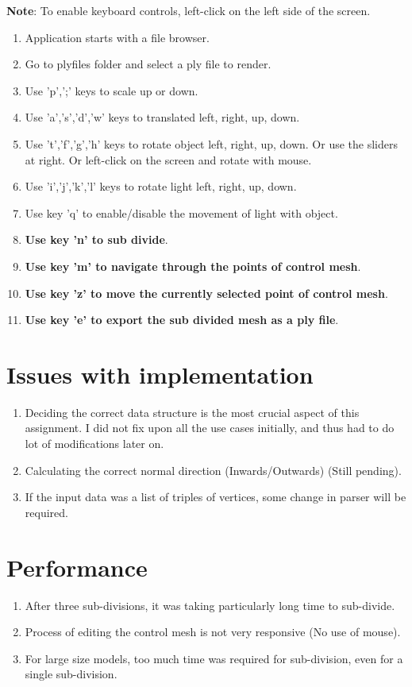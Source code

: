 \documentclass[11pt]{article}
\begin{document}
\textbf{Note}: To enable keyboard controls, left-click on the left side of the screen.

\begin {enumerate}
\item Application starts with a file browser.
\item Go to plyfiles folder and select a ply file to render.
\item Use 'p',';' keys to scale up or down.
\item Use 'a','s','d','w' keys to translated left, right, up, down.
\item Use 't','f','g','h' keys to rotate object left, right, up, down. Or use the sliders at right. Or left-click on the screen and rotate with mouse.
\item Use 'i','j','k','l' keys to rotate light left, right, up, down.
\item Use key 'q' to enable/disable the movement of light with object.
\item \textbf{Use key 'n' to sub divide}.
\item \textbf{Use key 'm' to navigate through the points of control mesh}.
\item \textbf{Use key 'z' to move the currently selected point of control mesh}.
\item \textbf{Use key 'e' to export the sub divided mesh as a ply file}.


\end {enumerate}

\section{ Issues with implementation}

\begin {enumerate}
\item Deciding the correct data structure is the most crucial aspect of this assignment. I did not fix upon all the use cases initially, and thus had to do lot of modifications later on.
\item Calculating the correct normal direction (Inwards/Outwards) (Still pending).
\item If the input data was a list of triples of vertices, some change in parser will be required.
\end {enumerate}             

\section{ Performance}

\begin {enumerate}
\item After three sub-divisions, it was taking particularly long time to sub-divide.
\item Process of editing the control mesh is not very responsive (No use of mouse).
\item For large size models, too much time was required for sub-division, even for a single sub-division.
\end {enumerate}   
\end{document}
